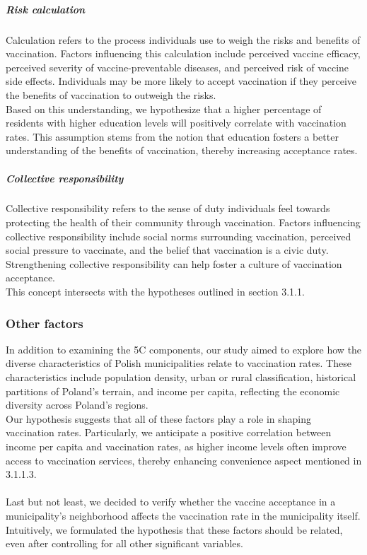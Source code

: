 \documentclass[a4paper,12pt]{article} %
\begin{document}
\subparagraph{Risk calculation}
Calculation refers to the process individuals use to weigh the risks and benefits of vaccination. Factors influencing this calculation include perceived vaccine efficacy, perceived severity of vaccine-preventable diseases, and perceived risk of vaccine side effects. Individuals may be more likely to accept vaccination if they perceive the benefits of vaccination to outweigh the risks.
\\
Based on this understanding, we hypothesize that a higher percentage of residents with higher education levels will positively correlate with vaccination rates. This assumption stems from the notion that education fosters a better understanding of the benefits of vaccination, thereby increasing acceptance rates.

\subparagraph{Collective responsibility}
Collective responsibility refers to the sense of duty individuals feel towards protecting the health of their community through vaccination. Factors influencing collective responsibility include social norms surrounding vaccination, perceived social pressure to vaccinate, and the belief that vaccination is a civic duty. Strengthening collective responsibility can help foster a culture of vaccination acceptance.
\\
This concept intersects with the hypotheses outlined in section 3.1.1.

\subsubsection{Other factors}
In addition to examining the 5C components, our study aimed to explore how the diverse characteristics of Polish municipalities relate to vaccination rates. These characteristics include population density, urban or rural classification, historical partitions of Poland's terrain, and income per capita, reflecting the economic diversity across Poland's regions.
\\
Our hypothesis suggests that all of these factors play a role in shaping vaccination rates. Particularly, we anticipate a positive correlation between income per capita and vaccination rates, as higher income levels often improve access to vaccination services, thereby enhancing convenience aspect mentioned in 3.1.1.3.
\\
\\
Last but not least, we decided to verify whether the vaccine acceptance in a municipality's neighborhood affects the vaccination rate in the municipality itself. Intuitively, we formulated the hypothesis that these factors should be related, even after controlling for all other significant variables.
\end{document}
